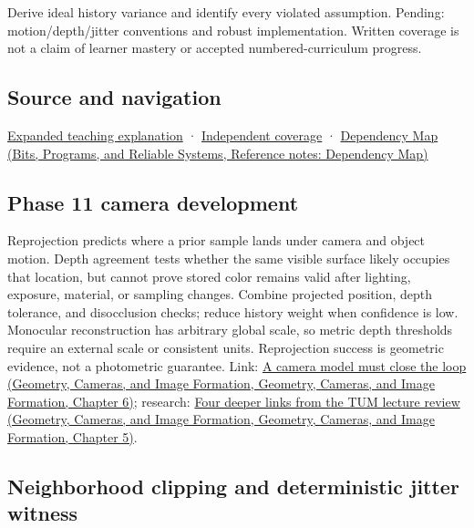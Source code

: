 Derive ideal history variance and identify every violated assumption. Pending: motion/depth/jitter conventions and robust implementation. Written coverage is not a claim of learner mastery or accepted numbered-curriculum progress.

\subsection{Source and navigation}\label{appendix-0727340a4428-source-and-navigation}

\hyperref[04-visual-computing-ii-ch042-temporal-reconstruction-is-an-inference-about-correspondence]{Expanded teaching explanation} · \hyperref[appendix-fd090d982a15-xr01---independent-seeing-and-representation-source]{Independent coverage} · \href{../01-Bits-Programs-and-Reliable-Systems/main.pdf\#nameddest=appendix-4ad47bdd269a}{Dependency Map (Bits, Programs, and Reliable Systems, Reference notes: Dependency Map)}

\subsection{Phase 11 camera development}\label{appendix-0727340a4428-phase-11-camera-development}

Reprojection predicts where a prior sample lands under camera and object motion. Depth agreement tests whether the same visible surface likely occupies that location, but cannot prove stored color remains valid after lighting, exposure, material, or sampling changes. Combine projected position, depth tolerance, and disocclusion checks; reduce history weight when confidence is low. Monocular reconstruction has arbitrary global scale, so metric depth thresholds require an external scale or consistent units. Reprojection success is geometric evidence, not a photometric guarantee. Link: \href{../03-Geometry-Cameras-and-Image-Formation/main.pdf\#nameddest=02-foundations-ii-ch037-a-camera-model-must-close-the-loop}{A camera model must close the loop (Geometry, Cameras, and Image Formation, Geometry, Cameras, and Image Formation, Chapter 6)}; research: \href{../03-Geometry-Cameras-and-Image-Formation/main.pdf\#nameddest=02-foundations-ii-ch036-four-deeper-links-from-the-tum-lecture-review}{Four deeper links from the TUM lecture review (Geometry, Cameras, and Image Formation, Geometry, Cameras, and Image Formation, Chapter 5)}.

\subsection{Neighborhood clipping and deterministic jitter witness}\label{appendix-0727340a4428-neighborhood-clipping-and-deterministic-jitter-witness}

